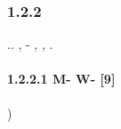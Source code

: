 \documentclass[a4paper]{article}
\begin{document}
\bigskip


\bigskip

\subsubsection[1.2.2 {\CYRR}{\cyra}{\cyrd}{\cyri}{\cyra}{\cyrl}{\cyrsftsn}{\cyrn}{\cyra}{\cyrya}
{\cyrch}{\cyra}{\cyrs}{\cyrt}{\cyrsftsn}]{1.2.2
{\CYRR}{\cyra}{\cyrd}{\cyri}{\cyra}{\cyrl}{\cyrsftsn}{\cyrn}{\cyra}{\cyrya} {\cyrch}{\cyra}{\cyrs}{\cyrt}{\cyrsftsn}}
\hypertarget{RefHeading4677463868395}{}{\CYRT}.{\cyrk}. {\cyru}{\cyrr}{\cyra}{\cyrv}{\cyrn}{\cyre}{\cyrn}{\cyri}{\cyre}
{\cyrn}{\cyra} {\cyrr}{\cyra}{\cyrd}{\cyri}{\cyra}{\cyrl}{\cyrsftsn}{\cyrn}{\cyru}{\cyryu}
{\cyrch}{\cyra}{\cyrs}{\cyrt}{\cyrsftsn} {\cyrk}{\cyra}{\cyrk} {\cyrv}
{\cyrk}{\cyru}{\cyrl}{\cyro}{\cyrn}{\cyro}{\cyrv}{\cyrs}{\cyrk}{\cyro}{\cyrm}, {\cyrk}{\cyra}{\cyrk} {\cyri} {\cyrv}
{\cyrk}{\cyru}{\cyrl}{\cyro}{\cyrn}-{\cyrd}{\cyri}{\cyrp}{\cyro}{\cyrl}{\cyrsftsn}{\cyrn}{\cyro}{\cyrm}
{\cyrs}{\cyrl}{\cyru}{\cyrch}{\cyra}{\cyre} {\cyrm}{\cyro}{\cyrzh}{\cyrn}{\cyro}
{\cyrs}{\cyrv}{\cyre}{\cyrs}{\cyrt}{\cyri} {\cyrk} {\cyru}{\cyrr}{\cyra}{\cyrv}{\cyrn}{\cyre}{\cyrn}{\cyri}{\cyryu}
{\cyrn}{\cyra} {\cyrf}{\cyru}{\cyrk}{\cyrc}{\cyri}{\cyryu}
{\CYRU}{\cyri}{\cyrt}{\cyre}{\cyrk}{\cyrk}{\cyre}{\cyrr}{\cyra},
{\cyrr}{\cyra}{\cyrs}{\cyrs}{\cyrm}{\cyro}{\cyrt}{\cyrr}{\cyri}{\cyrm}
{\cyrn}{\cyre}{\cyrk}{\cyro}{\cyrt}{\cyro}{\cyrr}{\cyrery}{\cyre}
{\cyrs}{\cyrv}{\cyro}{\cyrishrt}{\cyrs}{\cyrt}{\cyrv}{\cyra} {\cyrerev}{\cyrt}{\cyri}{\cyrh}
{\cyrf}{\cyru}{\cyrn}{\cyrk}{\cyrc}{\cyri}{\cyrishrt}, {\cyrk}{\cyro}{\cyrt}{\cyro}{\cyrr}{\cyrery}{\cyre} {\cyrv}
{\cyrd}{\cyra}{\cyrl}{\cyrsftsn}{\cyrn}{\cyre}{\cyrishrt}{\cyrsh}{\cyre}{\cyrm} {\cyrb}{\cyru}{\cyrd}{\cyru}{\cyrt}
{\cyrn}{\cyra}{\cyrm} {\cyrp}{\cyro}{\cyrl}{\cyre}{\cyrz}{\cyrn}{\cyrery}.

\paragraph[1.2.2.1 {\CYRS}{\cyrv}{\cyro}{\cyrishrt}{\cyrs}{\cyrt}{\cyrv}{\cyra} M{}- {\cyri} W{}-
{\cyrf}{\cyru}{\cyrn}{\cyrk}{\cyrc}{\cyri}{\cyrishrt}
{\CYRU}{\cyri}{\cyrt}{\cyre}{\cyrk}{\cyrk}{\cyre}{\cyrr}{\cyra}[9{]}]{1.2.2.1
{\CYRS}{\cyrv}{\cyro}{\cyrishrt}{\cyrs}{\cyrt}{\cyrv}{\cyra} \foreignlanguage{english}{M}{}- {\cyri}
\foreignlanguage{english}{W}{}- {\cyrf}{\cyru}{\cyrn}{\cyrk}{\cyrc}{\cyri}{\cyrishrt}
{\CYRU}{\cyri}{\cyrt}{\cyre}{\cyrk}{\cyrk}{\cyre}{\cyrr}{\cyra}[9]}
\hypertarget{RefHeading4679463868395}{}{\cyra}) {\CYRU}{\cyrr}{\cyra}{\cyrv}{\cyrn}{\cyre}{\cyrn}{\cyri}{\cyre}
{\cyrn}{\cyra} {\cyrf}{\cyru}{\cyrn}{\cyrk}{\cyrc}{\cyri}{\cyri}
\end{document}

